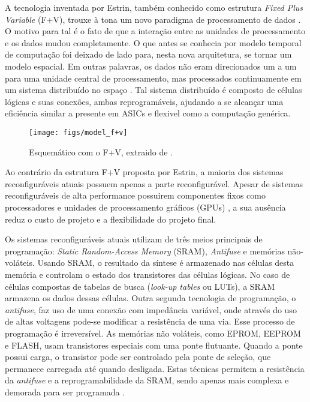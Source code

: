 \documentclass[11pt,a4paper,oneside]{book}
\begin{document}
A tecnologia inventada por Estrin, tamb\'em conhecido como estrutura \textit{Fixed Plus Variable} (F+V), trouxe \`a tona um novo paradigma de processamento de dados \cite{Hartenstein2001}.
O motivo para tal \'e o fato de que a intera\c{c}\~ao entre as unidades de processamento e os dados mudou completamente.
O que antes se conhecia por modelo temporal de computa\c{c}\~ao foi deixado de lado para, nesta nova arquitetura, se tornar um modelo espacial.
Em outras palavras, os dados n\~ao eram direcionados um a um para uma unidade central de processamento, mas processados continuamente em um sistema distribu\'i­do no espa\c{c}o \cite{vassiliadis2007fine}.
Tal sistema distribu\'i­do \'e composto de c\'elulas l\'ogicas e suas conex\~oes, ambas reprogram\'aveis, ajudando a se alcan\c{c}ar uma efici\^encia similar a presente em ASICs e flexivel como a computa\c{c}\~ao gen\'erica.

\begin{figure}[h]
\centering
\texttt{[image: figs/model\_f+v]}
\caption{Esquem\'atico com o F+V, extraido de \cite{Estrin2002}.}
\label{fig:model_f+v}
\end{figure}

Ao contr\'ario da estrutura F+V proposta por Estrin, a maioria dos sistemas reconfigur\'aveis atuais possuem apenas a parte reconfigur\'avel.
Apesar de sistemas reconfigur\'aveis de alta performance possuirem componentes fixos como processadores e unidades de processamento gr\'aficos (GPUs) \cite{El-Ghazawi2008}, a sua aus\^encia reduz o custo de projeto e a flexibilidade do projeto final.

Os sistemas reconfigur\'aveis atuais utilizam de tr\^es meios principais de programa\c{c}\~ao: \textit{Static Random-Access Memory} (SRAM), \textit{Antifuse} e mem\'orias n\~ao-vol\'ateis.
Usando SRAM, o resultado da s\'i­ntese
 \'e armazenado nas c\'elulas desta mem\'oria e controlam o estado dos transistores das c\'elulas l\'ogicas.
No caso de c\'elulas compostas de tabelas de busca (\textit{look-up tables} ou LUTs), a SRAM armazena os dados dessas c\'elulas.
Outra segunda tecnologia de programa\c{c}\~ao, o \textit{antifuse}, faz uso de uma conex\~ao com imped\^ancia vari\'avel, onde atrav\'es do uso de altas voltagens pode-se modificar a resist\^encia de uma via.
Esse processo de programa\c{c}\~ao \'e irrevers\'i­vel.
As mem\'orias n\~ao vol\'ateis, como EPROM, EEPROM e FLASH, usam transistores especiais com uma ponte flutuante.
Quando a ponte possui carga, o transistor pode ser controlado pela ponte de sele\c{c}\~ao, que permanece carregada at\'e quando desligada.
Estas t\'ecnicas permitem a resist\^encia da \textit{antifuse} e a reprogramabilidade da SRAM, sendo apenas mais complexa e demorada para ser programada \cite{vassiliadis2007fine}.
\end{document}
